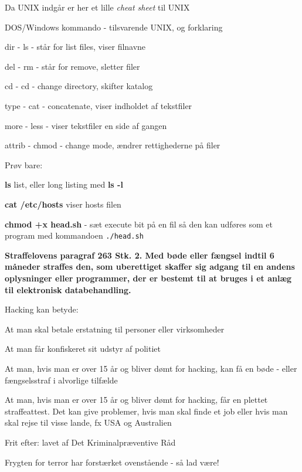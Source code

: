 \documentclass[20pt,landscape,a4paper,footrule]{foils}
\begin{document}
\begin{list1}
\item Da UNIX indgår er her et lille \emph{cheat sheet} til UNIX
\begin{list2}
\item DOS/Windows kommando - tilsvarende UNIX, og forklaring
\item dir - ls - står for list files, viser filnavne
\item del - rm - står for remove, sletter filer
\item cd - cd - change directory, skifter katalog
\item type - cat - concatenate, viser indholdet af tekstfiler
\item more - less - viser tekstfiler en side af gangen
\item attrib - chmod - change mode, ændrer rettighederne på filer
\end{list2}
\item Prøv bare:
  \begin{list2}
    \item {\bfseries ls} list, eller long listing med {\bfseries ls -l}
    \item {\bfseries cat /etc/hosts} viser hosts filen
\item {\bfseries chmod +x head.sh} - sæt execute bit på en fil så den
  kan udføres som et program med kommandoen \verb+./head.sh+
  \end{list2}
\end{list1}


{\bfseries Straffelovens paragraf 263 Stk. 2. Med bøde eller fængsel
  indtil 6 måneder
straffes den, som uberettiget skaffer sig adgang til en andens
oplysninger eller programmer, der er bestemt til at bruges i et anlæg
til elektronisk databehandling.}

Hacking kan betyde:
\begin{list2}
\item At man skal betale erstatning til personer eller virksomheder
\item At man får konfiskeret sit udstyr af politiet
\item At man, hvis man er over 15 år og bliver dømt for hacking, kan
  få en bøde - eller fængselsstraf i alvorlige tilfælde
\item At man, hvis man er over 15 år og bliver dømt for hacking, får
en plettet straffeattest. Det kan give problemer, hvis man skal finde
et job eller hvis man skal rejse til visse lande, fx USA og
Australien
\item Frit efter:  lavet af Det
  Kriminalpræventive Råd
\item Frygten for terror har forstærket ovenstående - så lad være!
\end{list2}
\end{document}
